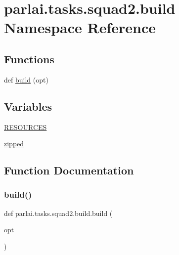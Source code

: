 \hypertarget{namespaceparlai_1_1tasks_1_1squad2_1_1build}{}\section{parlai.\+tasks.\+squad2.\+build Namespace Reference}
\label{namespaceparlai_1_1tasks_1_1squad2_1_1build}
\subsection*{Functions}
\begin{DoxyCompactItemize}
\item 
def \hyperlink{namespaceparlai_1_1tasks_1_1squad2_1_1build_ac3bace71a0761323718dcde114b169d7}{build} (opt)
\end{DoxyCompactItemize}
\subsection*{Variables}
\begin{DoxyCompactItemize}
\item 
\hyperlink{namespaceparlai_1_1tasks_1_1squad2_1_1build_a7ec1a941e12afae17dd74dc22fd2538e}{R\+E\+S\+O\+U\+R\+C\+ES}
\item 
\hyperlink{namespaceparlai_1_1tasks_1_1squad2_1_1build_a5086bb9e7aa7b98872a964e20c82b667}{zipped}
\end{DoxyCompactItemize}


\subsection{Function Documentation}
\mbox{\label{namespaceparlai_1_1tasks_1_1squad2_1_1build_ac3bace71a0761323718dcde114b169d7}} 
\subsubsection{\texorpdfstring{build()}{build()}}
{\footnotesize\ttfamily def parlai.\+tasks.\+squad2.\+build.\+build (\begin{DoxyParamCaption}\item[{}]{opt }\end{DoxyParamCaption})}



